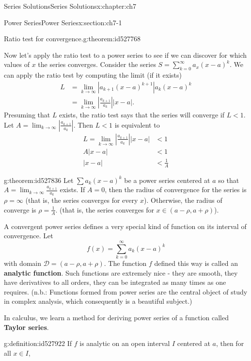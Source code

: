 \documentclass[oneside,10pt,]{book}
\newcommand{\terminology}[1]{\textbf{#1}}
\numberwithin{equation}{section}
\newcommand{\abs}[1]{\left\vert#1\right\vert}
\numberwithin{equation}{section}
\newcommand{\lt}{<}
\newcommand{\amp}{&}
\begin{document}
\begin{chapterptx}{Series Solutions}{}{Series Solutions}{}{}{x:chapter:ch7}
\begin{sectionptx}{Power Series}{}{Power Series}{}{}{x:section:ch7-1}
\begin{theorem}{Ratio test for convergence.}{}{g:theorem:id527768}
\end{theorem}
Now let's apply the ratio test to a power series to see if we can discover for which values of \(x\) the series converges. Consider the series \(S = \sum_{k=0}^\infty a_x (x - a)^k\). We can apply the ratio test by computing the limit (if it exists)%
\begin{align*}
L \amp = \lim_{k \to \infty} \abs{a_{k+1}(x - a)^{k+1}}{a_k(x -a)^k}\\
\amp = \lim_{k \to \infty} \abs{\frac{a_{k+1}}{a_k}} \abs{x - a}.
\end{align*}
Presuming that \(L\) exists, the ratio test says that the series will converge if \(L \lt 1\). Let \(A = \lim_{k\to\infty} \abs{\frac{a_{k+1}}{a_k}}\). Then \(L \lt 1\) is equivalent to%
\begin{align*}
L  = \lim_{k\to\infty} \abs{\frac{a_{k+1}}{a_k}} \abs{x - a} \amp \lt 1\\
A \abs{x - a} \amp \lt 1\\
\abs{x -a} \amp \lt \frac{1}{A}
\end{align*}
%
\begin{theorem}{}{}{g:theorem:id527836}%
Let \(\sum a_k (x-a)^k\) be a power series centered at \(a\) so that \(A = \lim_{k\to\infty}\frac{a_{k+1}}{a_k}\) exists. If \(A = 0\), then the radius of convergence for the series is \(\rho = \infty\) (that is, the series converges for every \(x\)). Otherwise, the radius of converge is \(\rho = \frac{1}{A}\). (that is, the series converges for \(x \in (a - \rho, a + \rho)\)).%
\end{theorem}
A convergent power series defines a very special kind of function on its interval of convergence. Let%
\begin{equation*}
f(x) = \sum_{k=0}^{\infty} a_k (x - a)^k
\end{equation*}
with domain \(\mathcal D = (a -\rho, a+\rho)\). The function \(f\) defined this way is called an \terminology{analytic function}. Such functions are extremely nice - they are smooth, they have derivatives to all orders, they can be integrated as many times as one requires. (n.b.: Functions formed from power series are the central object of study in complex analysis, which consequently is a beautiful subject.)%
\par
In calculus, we learn a method for deriving power series of a function called \terminology{Taylor series}. \begin{definition}{}{g:definition:id527922}%
If \(f\) is analytic on an open interval \(I\) centered at \(a\), then for all \(x \in I\),%

\end{definition}
\end{sectionptx}
\end{chapterptx}
\end{document}

